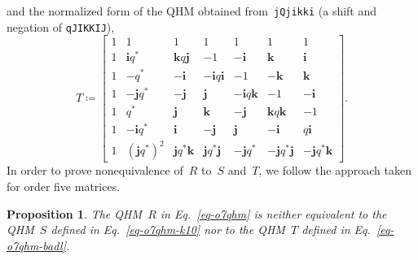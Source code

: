 \documentclass[12pt]{article}
\numberwithin{equation}{section}
\newtheorem{proposition}[theorem]{Proposition}
\newcommand{\qi}{\mathbf{i}}
\newcommand{\qj}{\mathbf{j}}
\newcommand{\qk}{\mathbf{k}}
\newcommand{\eqdef}{\coloneqq}
\begin{document}
and the normalized form of the QHM obtained from~\verb|jQjikki| (a shift and negation of \verb|qJIKKIJ|),
\begin{equation}
\label{eq-o7qhm-badl}
T \eqdef
\begin{bmatrix}
1 & 1 & 1 & 1 & 1 & 1 & 1 \\
1 & \qi q^* & \qk q \qj & -1 & -\qi & \qk & \qi \\
1 & -q^* & -\qi & -\qi q \qi & -1 & -\qk & \qk \\
1 & -\qj q^* & -\qj & \qj & -\qi q \qk & -1 & -\qi \\
1 & q^* & \qj & \qk & -\qj & \qk q \qk & -1 \\
1 & -\qi q^* & \qi & -\qj & \qj & -\qi & q \qi \\
1 & (\qj q^*)^2 & \qj q^* \qk & \qj q^* \qj & -\qj q^* & -\qj q^* \qj & -\qj q^* \qk
\end{bmatrix} .
\end{equation}
In order to prove nonequivalence of~$R$ to~$S$ and~$T$, we follow the approach taken for order five matrices.
\begin{proposition}
\label{prop-o7-nonequiv}
The QHM\/~$R$ in Eq.~\eqref{eq-o7qhm} is neither equivalent to the QHM\/~$S$ defined in Eq.~\eqref{eq-o7qhm-k10} nor to the QHM\/~$T$ defined in Eq.~\eqref{eq-o7qhm-badl}.
\end{proposition}
\end{document}
